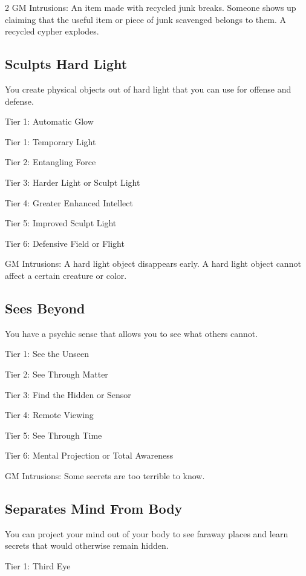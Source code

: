 \begin{multicols}{2}
GM Intrusions: An item made with recycled junk breaks. Someone shows up claiming that the useful item or piece of junk scavenged belongs to them. A recycled cypher explodes.

\subsection{Sculpts Hard Light}

You create physical objects out of hard light that you can use for offense and defense.

Tier 1: Automatic Glow

Tier 1: Temporary Light

Tier 2: Entangling Force 

Tier 3: Harder Light or Sculpt Light 

Tier 4: Greater Enhanced Intellect 

Tier 5: Improved Sculpt Light 

Tier 6: Defensive Field or Flight 

GM Intrusions: A hard light object disappears early. A hard light object cannot affect a certain creature or color.

\subsection{Sees Beyond}

You have a psychic sense that allows you to see what others cannot.

Tier 1: See the Unseen

Tier 2: See Through Matter

Tier 3: Find the Hidden or Sensor

Tier 4: Remote Viewing

Tier 5: See Through Time

Tier 6: Mental Projection or Total Awareness

GM Intrusions: Some secrets are too terrible to know. 

\subsection{Separates Mind From Body}

You can project your mind out of your body to see faraway places and learn secrets that would otherwise remain hidden.

Tier 1: Third Eye


\end{multicols}
